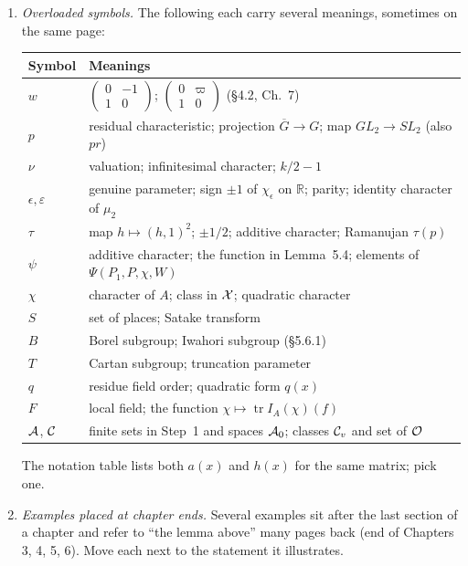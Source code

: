 \documentclass[12pt,letterpaper]{article}
\newcommand{\tr}{\operatorname{tr}}
\newcommand{\R}{\mathbb{R}}
\newcommand{\ov}[1]{\overline{#1}}
\theoremstyle{plain}
\begin{document}
\begin{enumerate}
\item \emph{Overloaded symbols.} The following each carry several
meanings, sometimes on the same page:

\medskip
\begin{center}
\begin{tabular}{@{}ll@{}}
\toprule
Symbol & Meanings\\
\midrule
$w$ & $\left(\begin{smallmatrix}0&-1\\1&0\end{smallmatrix}\right)$;
$\left(\begin{smallmatrix}0&\varpi\\1&0\end{smallmatrix}\right)$ (\S4.2, Ch.~7)\\
$p$ & residual characteristic; projection $\ov G\to G$; map $GL_2\to SL_2$ (also $pr$)\\
$\nu$ & valuation; infinitesimal character; $k/2-1$\\
$\epsilon,\varepsilon$ & genuine parameter; sign $\pm1$ of $\chi_\epsilon$ on $\R$; parity; identity character of $\mu_2$\\
$\tau$ & map $h\mapsto(h,1)^2$; $\pm1/2$; additive character; Ramanujan $\tau(p)$\\
$\psi$ & additive character; the function in Lemma~5.4; elements of $\Psi(P_1,P,\chi,W)$\\
$\chi$ & character of $A$; class in ${\cal X}$; quadratic character\\
$S$ & set of places; Satake transform\\
$B$ & Borel subgroup; Iwahori subgroup (\S5.6.1)\\
$T$ & Cartan subgroup; truncation parameter\\
$q$ & residue field order; quadratic form $q(x)$\\
$F$ & local field; the function $\chi\mapsto\tr I_A(\chi)(f)$\\
${\cal A}$, ${\cal C}$ & finite sets in Step~1 and spaces ${\cal A}_0$; classes ${\cal C}_v$ and set of ${\cal O}$\\
\bottomrule
\end{tabular}
\end{center}
\medskip

The notation table lists both $a(x)$ and $h(x)$ for the same matrix; pick
one.

\item \emph{Examples placed at chapter ends.} Several examples sit after
the last section of a chapter and refer to ``the lemma above'' many pages
back (end of Chapters 3, 4, 5, 6). Move each next to the statement it
illustrates.


\end{enumerate}
\end{document}
